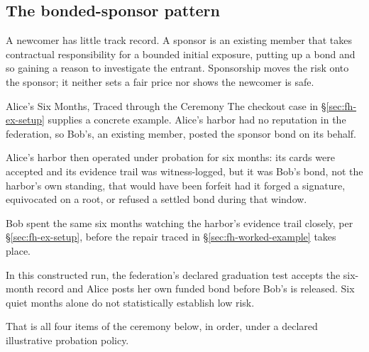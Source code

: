 \documentclass[11pt,a4paper]{article}
\theoremstyle{definition}
\theoremstyle{remark}
\begin{document}
\subsection{The bonded-sponsor pattern}\label{sec:fh-sponsor}

A newcomer has little track record. A sponsor is an existing member that takes
contractual responsibility for a bounded initial exposure, putting up a bond
and so gaining a reason to investigate the entrant. Sponsorship moves the risk
onto the sponsor; it neither sets a fair price nor shows the newcomer is safe.

\begin{pdexample}{Alice's Six Months, Traced through the Ceremony}
\setlength{\parskip}{4pt plus 1pt}
The checkout case in \S\ref{sec:fh-ex-setup} supplies a concrete example. Alice's harbor had no reputation in the federation, so Bob's, an existing member, posted the sponsor bond on its behalf.

Alice's harbor then operated under probation for six months: its cards were accepted and its evidence trail was witness-logged, but it was Bob's bond, not the harbor's own standing, that would have been forfeit had it forged a signature, equivocated on a root, or refused a settled bond during that window.

Bob spent the same six months watching the harbor's evidence trail closely, per \S\ref{sec:fh-ex-setup}, before the repair traced in \S\ref{sec:fh-worked-example} takes place.

In this constructed run, the federation's declared graduation test accepts
the six-month record and Alice posts her own funded bond before Bob's is
released. Six quiet months alone do not statistically establish low risk.

That is all four items of the ceremony below, in order, under a declared illustrative probation policy.
\end{pdexample}
\end{document}

